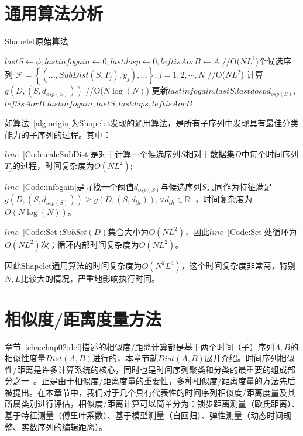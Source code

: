\section{通用算法分析}
\label{cha:chap02:generalalganalysis}
\begin{algorithm}
	\caption{Shapelet原始算法}
	\label{alg:origin}
	\begin{algorithmic}[1]
			\State $lastS \gets \phi, lastinfogain \gets 0, lastdosp \gets 0, leftisAorB\gets A$ 
			 \label{Code:Set} //O($NL^2$)个候选序列
				\State $\mathcal{F} = \left\lbrace (...,SubDist(S,T_j),y_j),...\right\rbrace,j = 1,2,\cdots,N$ \label{Code:calcSubDist} //O($NL^2$)
				\State 计算$g(D,(S,d_{osp(S)}))$ \label{Code:infogain}  //O($N\log(N)$)
					\State 更新$lastinfogain$,$lastS$,$lastdospd_{osp(S)}$,$leftisAorB$
				\EndIf
			\EndFor
			\State \Return $lastinfogain,lastS,lastdops,leftisAorB$
		\EndFunction
	\end{algorithmic}
\end{algorithm}

如算法~\ref{alg:origin}为Shapelet发现的通用算法，是所有子序列中发现具有最佳分类能力的子序列的过程。其中：

$line$~\ref{Code:calcSubDist}是对于计算一个候选序列$S$相对于数据集$D$中每个时间序列$T_j$的过程，时间复杂度为$O(NL^2)$;

$line$~\ref{Code:infogain}是寻找一个阈值$d_{osp(S)}$与候选序列$S$共同作为特征满足$g(D,(S,d_{osp(S)})) \geq g(D,(S,d_{th})),\forall d_{th}\in \mathbb{R}_{+}$，时间复杂度为$O(N\log(N))$。

$line$~\ref{Code:Set}:$SubSet(D)$集合大小为$O(NL^2)$，因此$line$~\ref{Code:Set}处循环为$O(NL^2)$次；循环内部时间复杂度为$O(NL^2)$。

因此Shapelet通用算法的时间复杂度为$O(N^2L^4)$，这个时间复杂度非常高，特别$N,L$比较大的情况，严重地影响执行时间。

\section{相似度/距离度量方法}
\label{cha:chap02:Distance}

章节~\ref{cha:chap02:def}描述的相似度/距离计算都是基于两个时间（子）序列$A,B$的相似性度量$Dist(A,B)$进行的，本章节就$Dist(A,B)$展开介绍。时间序列相似性/距离是许多计算系统的核心，同时也是时间序列聚类和分类的最重要的组成部分之一~\cite{patidar2012analysis}。正是由于相似度/距离度量的重要性，多种相似度/距离度量的方法先后被提出。在本章节中，我们对于几个具有代表性的时间序列相似度/距离度量及其所属类别进行评估，相似度/距离计算可以简单分为\cite{ding2008querying}：锁步距离测量（欧氏距离）、基于特征测量（傅里叶系数）、基于模型测量（自回归）、弹性测量（动态时间规整、实数序列的编辑距离）。

